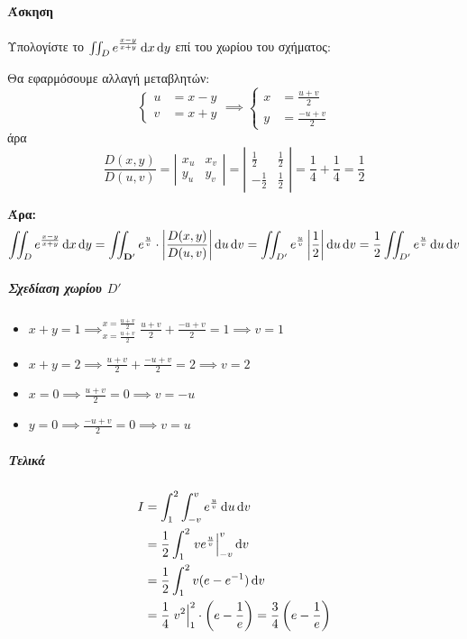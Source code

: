 \documentclass[11pt,a4paper,titlepage,draft]{article}
\begin{document}
\paragraph{Άσκηση}
Υπολογίστε το \(\iint_D e^{\frac{x-y}{x+y}} \dif x \dif y\) επί του χωρίου του σχήματος:

Θα εφαρμόσουμε αλλαγή μεταβλητών:
\[
\begin{cases}
u&=x-y\\v&=x+y
\end{cases}
\implies
\begin{cases}
x&=\frac{u+v}{2}\\
y&=\frac{-u+v}{2}
\end{cases}
\]
άρα
\[
\frac{D(x,y)}{D(u,v)} = \left|
\begin{matrix}
x_u&x_v\\y_u&y_v
\end{matrix}
\right|=\left|
\begin{matrix}
\frac{1}{2}&\frac{1}{2}\\-\frac{1}{2}&\frac{1}{2}
\end{matrix}
\right|=\frac{1}{4}+\frac{1}{4}=\frac{1}{2}
\]

\textbf{Άρα:}
\[
\iint_D e^{\frac{x-y}{x+y}}\dif x \dif y = \iint_\mathbf{D'}e^\frac{u}{v} \cdot \left|
\frac{D(x,y)}{D(u,v)}\right|\dif u \dif v = \iint_{D'} e^\frac{u}{v}\left|\frac{1}{2}\right| \dif u \dif v
= \frac{1}{2} \iint_{D'} e^\frac{u}{v} \dif u \dif v
\]

\subparagraph{Σχεδίαση χωρίου $D'$}
\begin{itemize}
\item \(x+y=1 \implies^{x=\frac{u+v}{2}}_{x=\frac{u+v}{2}} \frac{u+v}{2}+ \frac{-u+v}{2} = 1 \implies \boxed{v=1}\)\\
\item \(x+y=2 \implies \frac{u+v}{2}+ \frac{-u+v}{2} = 2 \implies \boxed{v=2}\)\\
\item \(x=0 \implies \frac{u+v}{2} = 0 \implies \boxed{v=-u}\)
\item \(y=0 \implies \frac{-u+v}{2} = 0 \implies \boxed{v=u}\)
\end{itemize}

\subparagraph{Τελικά}
\begin{align*}
I &= \int_1^2\int_{-v}^v e^\frac{u}{v} \dif u \dif v \\
&= \frac{1}{2} \int_1^2 \left.ve^\frac{u}{v}\right|_{-v}^v \dif v \\
&= \frac{1}{2} \int_1^2 v(e-e^{-1})\dif v \\
&= \frac{1}{4} \left. v^2 \right|_1^2 \cdot \left( e-\frac{1}{e} \right) = \frac{3}{4} \left(
e- \frac{1}{e}
\right)
\end{align*}
\end{document}
